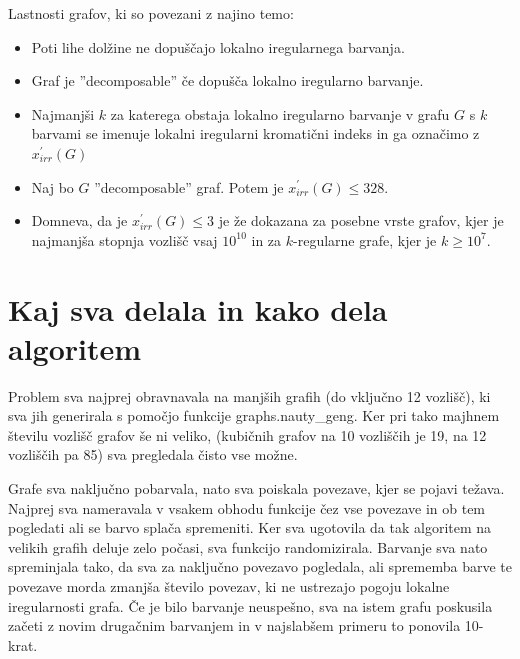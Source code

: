 \documentclass[12pt, a4paper]{article}
\begin{document}
Lastnosti grafov, ki so povezani z najino temo:
\begin{itemize}

\item Poti lihe dolžine ne dopuščajo lokalno iregularnega barvanja.
\item Graf je ''decomposable'' če dopušča lokalno iregularno barvanje.
\item Najmanjši $k$ za katerega obstaja lokalno iregularno barvanje v grafu $G$ s $k$ barvami se imenuje lokalni iregularni kromatični indeks in ga označimo z $x^'_{irr}(G)$
\item Naj bo $G$ ''decomposable'' graf. Potem je $x^'_{irr}(G) \leq 328$.
\item Domneva, da je $x^'_{irr}(G) \leq 3$ je že dokazana za posebne vrste grafov, kjer je najmanjša stopnja vozlišč vsaj $10^{10}$ in za $k$-regularne grafe, kjer je $k \geq 10^7$.

\end{itemize}

\newpage
\section{Kaj sva delala in kako dela algoritem}\textit{}\textit{}

Problem sva najprej obravnavala na manjših graﬁh (do vključno 12 vozlišč), ki sva jih generirala s pomočjo funkcije graphs.nauty_geng. Ker pri tako majhnem številu vozlišč grafov še ni veliko, (kubičnih grafov na 10 vozliščih je 19, na 12 vozliščih pa 85) sva pregledala čisto vse možne.

Grafe sva naključno pobarvala, nato sva poiskala povezave, kjer se pojavi težava. Najprej sva nameravala v vsakem obhodu funkcije čez vse povezave in ob tem pogledati ali se barvo splača spremeniti. Ker sva ugotovila da tak algoritem na velikih grafih deluje zelo počasi, sva funkcijo randomizirala. Barvanje sva nato spreminjala tako, da sva za naključno  povezavo pogledala, ali sprememba barve te povezave morda zmanjša število povezav, ki ne ustrezajo pogoju lokalne iregularnosti grafa. Če je bilo barvanje neuspešno, sva na istem grafu poskusila začeti z novim drugačnim barvanjem in v najslabšem primeru to ponovila 10-krat.
\end{document}
